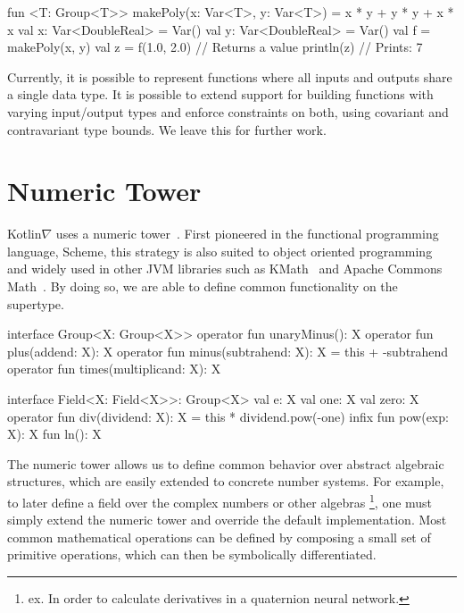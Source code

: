 \documentclass[12pt,initial,twoside,maitrise]{dms}
\numberwithin{equation}{section}
\numberwithin{table}{chapter}
\numberwithin{figure}{chapter}
\begin{document}
\begin{mylisting}
fun <T: Group<T>> makePoly(x: Var<T>, y: Var<T>) = x * y + y * y + x * x
val x: Var<DoubleReal> = Var()
val y: Var<DoubleReal> = Var()
val f = makePoly(x, y)
val z = f(1.0, 2.0) // Returns a value
println(z) // Prints: 7
\end{mylisting}

Currently, it is possible to represent functions where all inputs and outputs share a single data type. It is possible to extend support for building functions with varying input/output types and enforce constraints on both, using covariant and contravariant type bounds. We leave this for further work.

\section{Numeric Tower}\label{sec:numeric-tower}

Kotlin$\nabla$ uses a numeric tower~\citep{st2012typing}. First pioneered in the functional programming language, Scheme\citep{sperber2009revised}, this strategy is also suited to object oriented programming~\citep{niculescu2003design, niculescu2011using} and widely used in other JVM libraries such as KMath~\citep{nozik2019acat} and Apache Commons Math~\citep{developers2012apache}. By doing so, we are able to define common functionality on the supertype.

\begin{mylisting}[caption={Most mathematical operations are composed of a small set of simple operators.}, language=Kotlin]
interface Group<X: Group<X>> {
    operator fun unaryMinus(): X
    operator fun plus(addend: X): X
    operator fun minus(subtrahend: X): X = this + -subtrahend
    operator fun times(multiplicand: X): X
}

interface Field<X: Field<X>>: Group<X> {
    val e: X
    val one: X
    val zero: X
    operator fun div(dividend: X): X = this * dividend.pow(-one)
    infix fun pow(exp: X): X
    fun ln(): X
}
\end{mylisting}

The numeric tower allows us to define common behavior over abstract algebraic structures, which are easily extended to concrete number systems. For example, to later define a field over the complex numbers or other algebras \footnote{ex. In order to calculate derivatives in a quaternion neural network.\citep{isokawa2003quaternion}}, one must simply extend the numeric tower and override the default implementation. Most common mathematical operations can be defined by composing a small set of primitive operations, which can then be symbolically differentiated.
\end{document}
